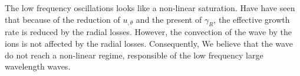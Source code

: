 The low frequency oscillations looks like a non-linear saturation. Have have seen that because of the reduction of $u_{, \theta}$ and the present of $\gamma_R$, the effective growth rate is reduced by the radial losses.
However, the convection of the wave by the ions is not affected by the radial losses.
Consequently, We believe that the wave do not reach a non-linear regime, responsible of the low frequency large wavelength waves.
% 
% 

\FloatBarrier
